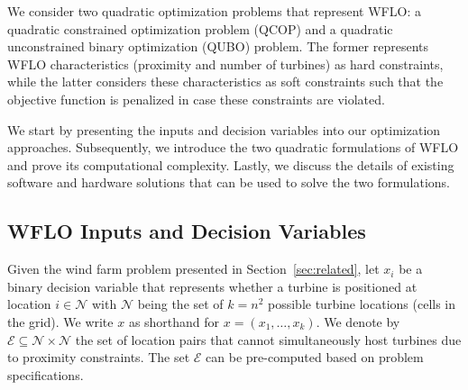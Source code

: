 \documentclass[preprint,12pt]{elsarticle}
\begin{document}
We consider two
quadratic optimization problems that represent WFLO: a
quadratic constrained optimization problem (QCOP) and 
a quadratic unconstrained binary optimization (QUBO) problem. 
The former represents WFLO characteristics (proximity and number of turbines)
as hard constraints, while the latter considers these characteristics as soft constraints such that the objective function is penalized in case these
constraints are violated.

We start by presenting the inputs and decision variables into our optimization approaches.
Subsequently, we introduce the two quadratic formulations of WFLO and 
prove its computational complexity. Lastly, we discuss the details of existing
software and hardware solutions that can be used to solve the two formulations. 

\subsection{WFLO Inputs and Decision Variables}
Given the wind farm problem presented in Section~\ref{sec:related},
let $x_i$ be a binary decision variable that represents whether a 
turbine is positioned at location 
$i \in \mathcal{N}$ with $\mathcal{N}$ being the set 
of $k = n^2$ possible turbine locations (cells in the grid). We 
write $x$ as shorthand for $x = (x_1,\ldots, x_k)$. 
We denote by $\mathcal{E} \subseteq \mathcal{N}\times \mathcal{N}$
the set of location pairs that cannot simultaneously host turbines 
due to proximity constraints. The set $\mathcal{E}$ can be pre-computed 
based on problem specifications.
\end{document}
